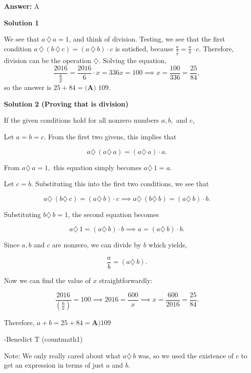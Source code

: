 \begin{enumerate}
 \textbf{Answer: }A



\textbf{Solution 1}

We see that $a \, \diamondsuit \, a = 1$, and think of division. Testing, we see that the first condition $a \, \diamondsuit \, (b \, \diamondsuit \, c) = (a \, \diamondsuit \, b) \cdot c$ is satisfied, because $\frac{a}{\frac{b}{c}} = \frac{a}{b} \cdot c$. Therefore, division can be the operation $\diamondsuit$. Solving the equation, 
 \[\frac{2016}{\frac{6}{x}} = \frac{2016}{6} \cdot x = 336x = 100\implies x=\frac{100}{336} = \frac{25}{84},\] so the answer is $25 + 84 = \boxed{\textbf{(A) }109}$.

 



\textbf{Solution 2 (Proving that  is division)}

If the given conditions hold for all nonzero numbers $a, b,$ and $c$, 

 Let $a=b=c.$ From the first two givens, this implies that 

 

 \[a\diamondsuit\, (a\diamondsuit\, {a})=(a\diamondsuit\, a)\cdot{a}.\]

 
From $a\diamondsuit\,{a}=1,$ this equation simply becomes $a\diamondsuit\,{1}=a.$

 
Let $c=b.$ Substituting this into the first two conditions, we see that 

 
 \[a\diamondsuit\, (b\diamondsuit\, {c})=(a\diamondsuit\, {b})\cdot{c} \implies a\diamondsuit\, (b\diamondsuit\, {b})=(a\diamondsuit\, {b})\cdot{b}.\]

 Substituting $b\diamondsuit\, {b} =1$, the second equation becomes

 
 \[a\diamondsuit\, {1}=(a\diamondsuit\, {b})\cdot{b} \implies a=(a\diamondsuit\,{b})\cdot{b}.\]

 Since $a, b$ and $c$ are nonzero, we can divide by $b$ which yields,

 
 \[\frac{a}{b}=(a\diamondsuit\, {b}).\]

 Now we can find the value of $x$ straightforwardly:

 
 \[\frac{2016}{(\frac{6}{x})}=100 \implies 2016=\frac{600}{x} \implies x=\frac{600}{2016} = \frac{25}{84}.\]

 Therefore, $a+b=25+84=\boxed{\textbf{A)} 109}$

 -Benedict T (countmath1)

 Note: We only really cared about what $a\diamondsuit\,{b}$ was, so we used the existence of $c$ to get an expression in terms of just $a$ and $b$.


\end{enumerate}

